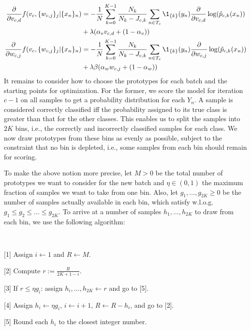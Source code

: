 %
\begin{align}
\frac{\partial}{\partial v_{c,d}}f(v_c,\{w_{c,j}\}_j|\{x_n\}_n)
&=-\frac{1}{N}\sum_{k=0}^{K-1}\frac{N_k}{N_k-J_{c,k}}\sum_{n\in T_c}
\1_{\{k\}}(y_n)\frac{\partial}{\partial v_{c,d}}\log(\hat{p}_{c,k}(x_n))
\label{eq_l_partial_v}\\
&+\lambda(\alpha_v v_{c,d}+(1-\alpha_v))\notag\\
\frac{\partial}{\partial w_{c,j}}f(v_c,\{w_{c,j}\}_j|\{x_n\}_n)
&=-\frac{1}{N}\sum_{k=0}^{K-1}\frac{N_k}{N_k-J_{c,k}}\sum_{n\in T_c}
\1_{\{k\}}(y_n)\frac{\partial}{\partial w_{c,j}}\log(\hat{p}_{c,k}(x_n))
\label{eq_l_partial_w}\\
&+\lambda\beta(\alpha_w w_{c,j}+(1-\alpha_w))\notag
\end{align}
%
It remains to consider how to choose the prototypes for each batch and the starting points for optimization.
For the former, we score the model for iteration $c-1$ on all samples to get a probability distribution for each $Y_n$.
A sample is considered correctly classified iff the probability assigned to its true class is greater than that for the other classes.
This enables us to split the samples into $2K$ bins, i.e., the correctly and incorrectly classified samples for each class.
We now draw prototypes from these bins as evenly as possible, subject to the constraint that no bin is depleted, i.e., some samples from each bin should remain for scoring.\par
%
To make the above notion more precise, let $M>0$ be the total number of prototypes we want to consider for the new batch and $\eta\in(0,1)$ the  maximum fraction of samples we want to take from one bin.
Also, let $g_1,\dots, g_{2K}\geq0$ be the number of samples actually available in each bin, which satisfy w.l.o.g.\ $g_1\leq g_2\leq\dots\leq g_{2K}$.
To arrive at a number of samples $h_1,\dots,h_{2K}$ to draw from each bin, we use the following algorithm:
%
\begin{samepage}
\begin{algorithm}~
\label{alg_bins}
%
\begin{description}
\item{[1]} Assign $i\leftarrow1$ and $R\leftarrow M$.
%
\item{[2]} Compute $r:=\frac{R}{2K+1-i}$.
%
\item{[3]} If $r\leq\eta g_i$: assign $h_i,\dots,h_{2K}\leftarrow r$ and go to [5].
%
\item{[4]} Assign $h_i\leftarrow\eta g_i$, $i\leftarrow i+1$, $R\leftarrow R-h_i$, and go to [2].
%
\item{[5]} Round each $h_i$ to the closest integer number.
\end{description}
\end{algorithm}
\end{samepage}
